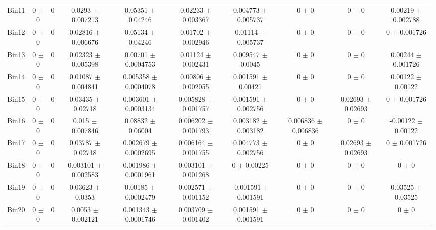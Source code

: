 \begin{tabular}{@{\extracolsep{4pt}}lccccccccc@{}}
     Bin11 & 0 $\pm$ 0 & 0 & 0.0293 $\pm$ 0.007213 & 0.05351 $\pm$ 0.04246 & 0.02233 $\pm$ 0.003367 & 0.004773 $\pm$ 0.005737 & 0 $\pm$ 0 & 0 $\pm$ 0 & 0.00219 $\pm$ 0.002788 \\ 
     Bin12 & 0 $\pm$ 0 & 0 & 0.02816 $\pm$ 0.006676 & 0.05134 $\pm$ 0.04246 & 0.01702 $\pm$ 0.002946 & 0.01114 $\pm$ 0.005737 & 0 $\pm$ 0 & 0 $\pm$ 0 & 0 $\pm$ 0.001726 \\ 
     Bin13 & 0 $\pm$ 0 & 0 & 0.02323 $\pm$ 0.005398 & 0.00701 $\pm$ 0.0004753 & 0.01124 $\pm$ 0.002431 & 0.009547 $\pm$ 0.0045 & 0 $\pm$ 0 & 0 $\pm$ 0 & 0.00244 $\pm$ 0.001726 \\ 
     Bin14 & 0 $\pm$ 0 & 0 & 0.01087 $\pm$ 0.004841 & 0.005358 $\pm$ 0.0004078 & 0.00806 $\pm$ 0.002055 & 0.001591 $\pm$ 0.00421 & 0 $\pm$ 0 & 0 $\pm$ 0 & 0.00122 $\pm$ 0.00122 \\ 
     Bin15 & 0 $\pm$ 0 & 0 & 0.03435 $\pm$ 0.02718 & 0.003601 $\pm$ 0.0003134 & 0.005828 $\pm$ 0.001757 & 0.001591 $\pm$ 0.002756 & 0 $\pm$ 0 & 0.02693 $\pm$ 0.02693 & 0 $\pm$ 0.001726 \\ 
     Bin16 & 0 $\pm$ 0 & 0 & 0.015 $\pm$ 0.007846 & 0.08832 $\pm$ 0.06004 & 0.006202 $\pm$ 0.001793 & 0.003182 $\pm$ 0.003182 & 0.006836 $\pm$ 0.006836 & 0 $\pm$ 0 & -0.00122 $\pm$ 0.00122 \\ 
     Bin17 & 0 $\pm$ 0 & 0 & 0.03787 $\pm$ 0.02718 & 0.002679 $\pm$ 0.0002695 & 0.006164 $\pm$ 0.001755 & 0.004773 $\pm$ 0.002756 & 0 $\pm$ 0 & 0.02693 $\pm$ 0.02693 & 0 $\pm$ 0.001726 \\ 
     Bin18 & 0 $\pm$ 0 & 0 & 0.003101 $\pm$ 0.002583 & 0.001986 $\pm$ 0.0001961 & 0.003101 $\pm$ 0.001268 & 0 $\pm$ 0.00225 & 0 $\pm$ 0 & 0 $\pm$ 0 & 0 $\pm$ 0 \\ 
     Bin19 & 0 $\pm$ 0 & 0 & 0.03623 $\pm$ 0.0353 & 0.00185 $\pm$ 0.0002479 & 0.002571 $\pm$ 0.001152 & -0.001591 $\pm$ 0.001591 & 0 $\pm$ 0 & 0 $\pm$ 0 & 0.03525 $\pm$ 0.03525 \\ 
     Bin20 & 0 $\pm$ 0 & 0 & 0.0053 $\pm$ 0.002121 & 0.001343 $\pm$ 0.0001746 & 0.003709 $\pm$ 0.001402 & 0.001591 $\pm$ 0.001591 & 0 $\pm$ 0 & 0 $\pm$ 0 & 0 $\pm$ 0 \\ 
\hline\hline
  \end{tabular}
